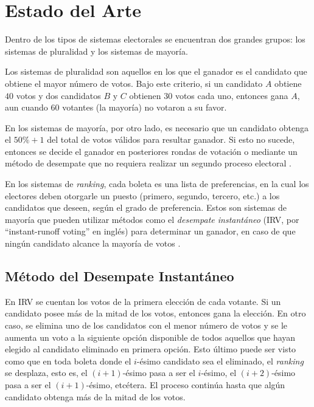 \chapter{Estado del Arte}\label{chapter:state-of-the-art}


Dentro de los tipos de sistemas electorales se encuentran dos grandes grupos: los sistemas de pluralidad y los sistemas de mayor\'ia. 

Los sistemas de pluralidad son aquellos en los que el ganador es el candidato que obtiene el mayor n\'umero de votos. Bajo este  criterio, si un candidato $A$ obtiene $40$ votos y dos candidatos $B$ y $C$ obtienen $30$ votos cada uno, entonces gana $A$, aun cuando $60$ votantes (la mayor\'ia) no votaron a su favor. 

En los sistemas de mayor\'ia, por otro lado, es necesario que un candidato obtenga el $50\% + 1$ del total de votos v\'alidos para resultar ganador. Si esto no sucede, entonces se decide el ganador en posteriores rondas de votaci\'on o mediante un m\'etodo de desempate que no requiera realizar un segundo proceso electoral \citep{electoral-systems-comparison}.

En los sistemas de \textit{ranking}, cada boleta es una lista de preferencias, en la cual los electores deben otorgarle un puesto (primero, segundo, tercero, etc.) a los  candidatos que deseen, seg\'un el grado de preferencia.  Estos son sistemas de mayor\'ia que pueden utilizar m\'etodos como el \textit{desempate instant\'aneo} (IRV, por ``instant-runoff voting'' en ingl\'es) para determinar un ganador, en caso de que ning\'un candidato alcance la mayor\'ia de votos \citep{electoral-systems-comparison}. 

\section{M\'etodo del Desempate Instant\'aneo}\label{sec:irv}
En IRV se cuentan los votos de la primera elecci\'on de cada votante. Si un candidato posee m\'as de la mitad de  los votos, entonces gana la elecci\'on. En otro caso, se elimina uno de los candidatos con el menor n\'umero de votos y se le aumenta un voto a la siguiente opci\'on disponible de todos aquellos que hayan elegido al candidato eliminado en primera opci\'on. Esto \'ultimo puede ser visto como que en toda boleta donde el $i$-\'esimo candidato sea el eliminado, el \textit{ranking} se desplaza, esto es, el $(i+1)$-\'esimo pasa a ser el $i$-\'esimo, el $(i+2)$-\'esimo pasa a ser el $(i+1)$-\'esimo, etc\'etera. El proceso contin\'ua hasta que alg\'un candidato obtenga m\'as de la mitad de los votos. 

